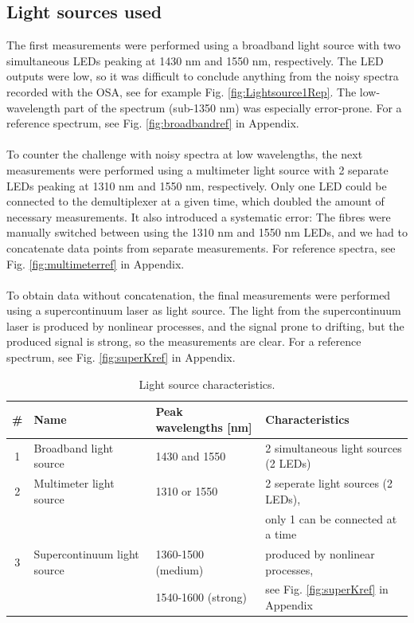 \subsection{Light sources used}
The first measurements were performed using a broadband light source with two simultaneous LEDs peaking at 1430 nm and 1550 nm, respectively. The LED outputs were low, so it was difficult to conclude anything from the noisy spectra recorded with the OSA, see for example Fig. \ref{fig:Lightsource1Rep}. The low-wavelength part of the spectrum (sub-1350 nm) was especially error-prone. For a reference spectrum, see Fig. \ref{fig:broadbandref} in Appendix. \\
\\
To counter the challenge with noisy spectra at low wavelengths, the next measurements were performed using a multimeter light source with 2 separate LEDs peaking at 1310 nm and 1550 nm, respectively. Only one LED could be connected to the demultiplexer at a given time, which doubled the amount of necessary measurements. It also introduced a systematic error: The fibres were manually switched between using the 1310 nm and 1550 nm LEDs, and we had to concatenate data points from separate measurements. For reference spectra, see Fig. \ref{fig:multimeterref} in Appendix.\\
\\
To obtain data without concatenation, the final measurements were performed using a supercontinuum laser as light source. The light from the supercontinuum laser is produced by nonlinear processes, and the signal prone to drifting, but the produced signal is strong, so the measurements are clear. For a reference spectrum, see Fig. \ref{fig:superKref} in Appendix. 

\begin{table}[h]
    \begin{tabular}{|clll|}
    \hline
    \textbf{\#} & \textbf{Name}                        & \textbf{Peak wavelengths [nm]} & \textbf{Characteristics}                        \\ \hline
    1               & Broadband light source      & 1430 and 1550         & 2 simultaneous light sources (2 LEDs)  \\ \hline
    2               & Multimeter light source     & 1310 or 1550          & 2 seperate light sources (2 LEDs),     \\
    ~               & ~                           & ~                     & only 1 can be connected at a time      \\ \hline
    3               & Supercontinuum light source & 1360-1500 (medium)    & produced by nonlinear processes,       \\
    ~               & ~                           & 1540-1600 (strong)    & see Fig. \ref{fig:superKref} in Appendix \\ \hline
    \end{tabular}
    \caption{Light source characteristics.}
     \label{tablelightsources}
\end{table}
